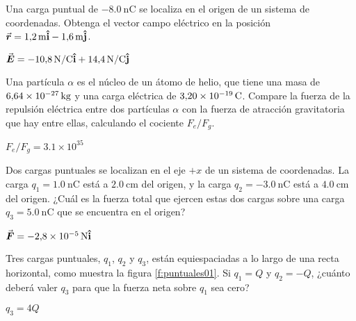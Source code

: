 \setcounter{figure}{0}

\begin{Exercise}
  Una carga puntual de $\SI{-8.0}{\nano\coulomb}$ se localiza en el origen de un sistema de coordenadas. Obtenga el vector campo eléctrico en la posición $\va*{r} = \SI{1.2}{\metre}\vu{i} - \SI{1.6}{\metre}\vu{j}$.
\end{Exercise}
\begin{Answer}
  $\va*{E} = \SI{-10.8}{\newton/\coulomb}\vu{i} + \SI{14.4}{\newton/\coulomb}\vu{j}$
\end{Answer}
%
\begin{Exercise}
Una partícula $\alpha$ es el núcleo de un átomo de helio, que tiene una masa de $\SI{6.64E-27}{\kilogram}$ y una carga eléctrica de $\SI{3.20E-19}{\coulomb}$. Compare la fuerza de la repulsión eléctrica entre dos partículas $\alpha$ con la fuerza de atracción gravitatoria que hay entre ellas, calculando el cociente $F_e/F_g$.
\end{Exercise}
\begin{Answer}
  $F_e/F_g = 3.1\times 10^{35}$
\end{Answer}
%
\begin{Exercise}
Dos cargas puntuales se localizan en el eje $+x$ de un sistema de coordenadas. La carga $q_1 = \SI{1.0}{\nano\coulomb}$ está a $\SI{2.0}{\centi\metre}$ del origen, y la carga $q_2 = \SI{-3.0}{\nano\coulomb}$ está a $\SI{4.0}{\centi\metre}$ del origen. ¿Cuál es la fuerza total que ejercen estas dos cargas sobre una carga $q_3 = \SI{5.0}{\nano\coulomb}$ que se encuentra en el origen?
\end{Exercise}
\begin{Answer}
  $\va*{F} = \SI{-2.8E-5}{\newton}\vu{i}$
\end{Answer}
%
\begin{Exercise}\label{p:puntuales01}
  Tres cargas puntuales, $q_1$, $q_2$ y $q_3$, están equiespaciadas a lo largo de una recta horizontal, como muestra la figura \ref{f:puntuales01}. Si $q_1 = Q$ y $q_2 = -Q$, ¿cuánto deberá valer $q_3$ para que la fuerza neta sobre $q_1$ sea cero?
\end{Exercise}
\begin{Answer}
  $q_3 = 4Q$
\end{Answer}
%
\begin{center}
\end{center}
